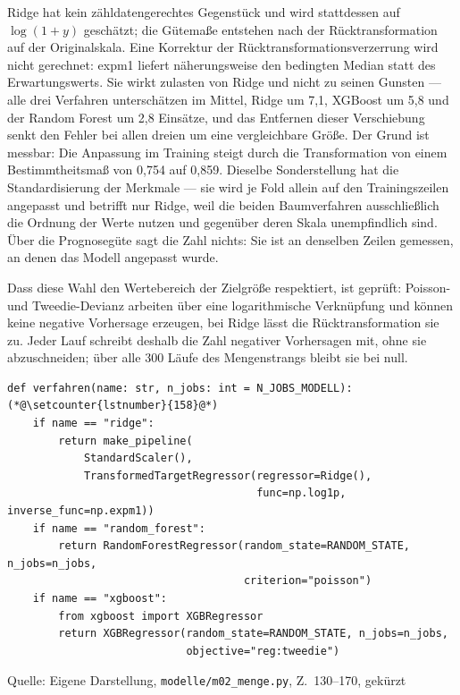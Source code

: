 \documentclass[12pt,a4paper]{article}
\newcommand{\tabquelle}[1][Eigene Darstellung]{%
  \par\setlength{\parskip}{0pt}\vspace{3pt}%
  {\setstretch{1}\fontsize{9pt}{11pt}\selectfont\raggedright Quelle: #1\par}%
}
\begin{document}
Ridge hat kein zähldatengerechtes Gegenstück und wird stattdessen auf
$\log(1+y)$ geschätzt; die Gütemaße entstehen nach der Rücktransformation auf
der Originalskala. Eine Korrektur der Rücktransformationsverzerrung wird nicht gerechnet: expm1 liefert näherungsweise den bedingten Median statt des Erwartungswerts. Sie wirkt zulasten von Ridge und nicht zu seinen Gunsten — alle drei Verfahren unterschätzen im Mittel, Ridge um 7,1, XGBoost um 5,8 und der Random Forest um 2,8 Einsätze, und das Entfernen dieser Verschiebung senkt den Fehler bei allen dreien um eine vergleichbare Größe. Der Grund ist messbar: Die Anpassung im Training steigt
durch die Transformation von einem Bestimmtheitsmaß von 0,754 auf 0,859.
Dieselbe Sonderstellung hat die Standardisierung der Merkmale --- sie wird je
Fold allein auf den Trainingszeilen angepasst und betrifft nur Ridge, weil die
beiden Baumverfahren ausschließlich die Ordnung der Werte nutzen und gegenüber
deren Skala unempfindlich sind. Über die Prognosegüte sagt die Zahl nichts: Sie
ist an denselben Zeilen gemessen, an denen das Modell angepasst wurde.

Dass diese Wahl den Wertebereich der Zielgröße respektiert, ist geprüft: Poisson- und Tweedie-Devianz arbeiten über eine logarithmische Verknüpfung und können keine negative Vorhersage erzeugen, bei Ridge lässt die Rücktransformation sie zu. Jeder Lauf schreibt deshalb die Zahl negativer Vorhersagen mit, ohne sie abzuschneiden; über alle 300 Läufe des Mengenstrangs bleibt sie bei null.

\begin{quellcode}[htbp]
\caption{Verlustfunktion und Zieltransformation je Verfahren}
\label{lst:verfahren}\vspace{-3.5pt}
\begin{lstlisting}[style=pythonstil,firstnumber=130]
def verfahren(name: str, n_jobs: int = N_JOBS_MODELL):(*@\setcounter{lstnumber}{158}@*)
    if name == "ridge":
        return make_pipeline(
            StandardScaler(),
            TransformedTargetRegressor(regressor=Ridge(),
                                       func=np.log1p, inverse_func=np.expm1))
    if name == "random_forest":
        return RandomForestRegressor(random_state=RANDOM_STATE, n_jobs=n_jobs,
                                     criterion="poisson")
    if name == "xgboost":
        from xgboost import XGBRegressor
        return XGBRegressor(random_state=RANDOM_STATE, n_jobs=n_jobs,
                            objective="reg:tweedie")
\end{lstlisting}
\tabquelle[Eigene Darstellung, \texttt{modelle/m02\_menge.py}, Z.~130--170, gekürzt]
\end{quellcode}
\end{document}
